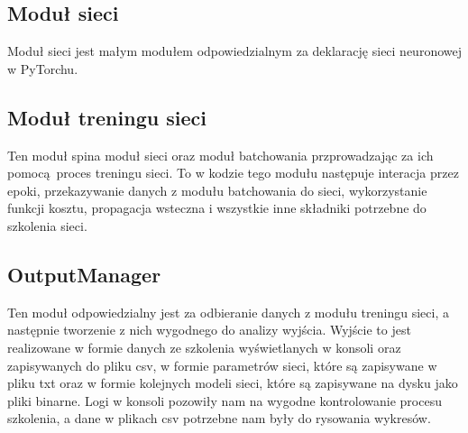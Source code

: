 \subsection{Moduł sieci}
Moduł sieci jest małym modułem odpowiedzialnym za deklarację sieci neuronowej w PyTorchu.

\subsection{Moduł treningu sieci}
Ten moduł spina moduł sieci oraz moduł batchowania przprowadzając za ich pomocą proces treningu sieci.
To w kodzie tego modułu następuje interacja przez epoki, przekazywanie danych z modułu batchowania
do sieci, wykorzystanie funkcji kosztu, propagacja wsteczna i wszystkie inne składniki potrzebne do
szkolenia sieci.

\subsection{OutputManager}
Ten moduł odpowiedzialny jest za odbieranie danych z modułu treningu sieci, a następnie tworzenie z nich
wygodnego do analizy wyjścia. Wyjście to jest realizowane w formie danych ze szkolenia wyświetlanych
w konsoli oraz zapisywanych do pliku csv, w formie parametrów sieci, które są zapisywane
w pliku txt oraz w formie kolejnych modeli sieci, które są zapisywane na dysku jako pliki binarne.
Logi w konsoli pozowiły nam na wygodne kontrolowanie procesu szkolenia, a dane w plikach csv potrzebne
nam były do rysowania wykresów.

\newpage
